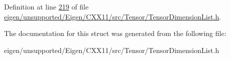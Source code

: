 Definition at line \hyperlink{eigen_2unsupported_2_eigen_2_c_x_x11_2src_2_tensor_2_tensor_dimension_list_8h_source_l00219}{219} of file \hyperlink{eigen_2unsupported_2_eigen_2_c_x_x11_2src_2_tensor_2_tensor_dimension_list_8h_source}{eigen/unsupported/\+Eigen/\+C\+X\+X11/src/\+Tensor/\+Tensor\+Dimension\+List.\+h}.



The documentation for this struct was generated from the following file\+:\begin{DoxyCompactItemize}
\item 
eigen/unsupported/\+Eigen/\+C\+X\+X11/src/\+Tensor/\+Tensor\+Dimension\+List.\+h\end{DoxyCompactItemize}
